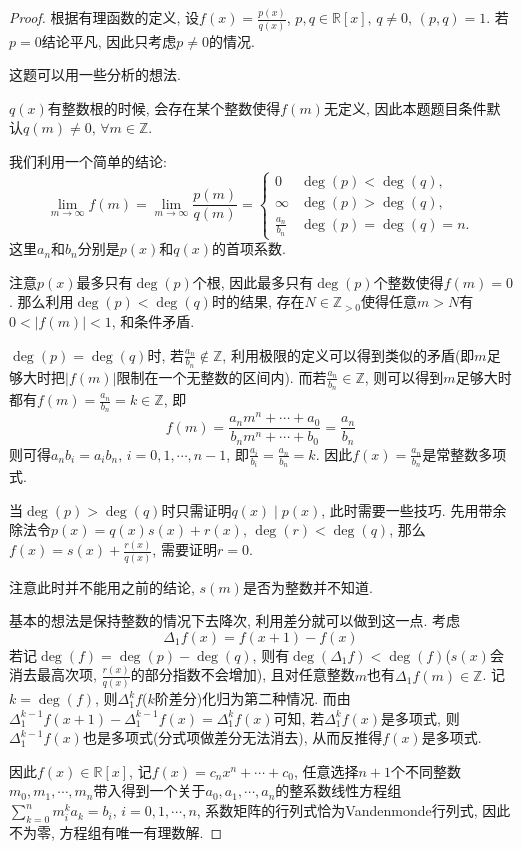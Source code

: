 \begin{proof}
    根据有理函数的定义, 设$f(x) = \frac{p(x)}{q(x)}$, $p, q \in \mathbb{R}[x],\, q \neq 0,\, (p, q) = 1$. 若$p = 0$结论平凡, 因此只考虑$p \neq 0$的情况.
    
    这题可以用一些分析的想法.
    \begin{remark}
        $q(x)$有整数根的时候, 会存在某个整数使得$f(m)$无定义, 因此本题题目条件默认$q(m) \neq 0,\, \forall m \in \mathbb{Z}$.
    \end{remark}
    我们利用一个简单的结论:
    \[
        \lim_{m \to \infty} f(m) = \lim_{m \to \infty} \frac{p(m)}{q(m)} =
        \begin{cases}
            0 & \deg(p) < \deg(q),\\
            \infty & \deg(p) > \deg(q),\\
            \frac{a_n}{b_n} & \deg(p) = \deg(q) = n.
        \end{cases}
    \]
    这里$a_n$和$b_n$分别是$p(x)$和$q(x)$的首项系数.

    注意$p(x)$最多只有$\deg(p)$个根, 因此最多只有$\deg(p)$个整数使得$f(m) = 0$. 那么利用$\deg(p) < \deg(q)$时的结果, 存在$N \in \mathbb{Z}_{>0}$使得任意$m > N$有$0 < |f(m)| < 1$, 和条件矛盾.

    $\deg(p) = \deg(q)$时, 若$\frac{a_n}{b_n} \notin \mathbb{Z}$, 利用极限的定义可以得到类似的矛盾(即$m$足够大时把$|f(m)|$限制在一个无整数的区间内). 而若$\frac{a_n}{b_n} \in \mathbb{Z}$, 则可以得到$m$足够大时都有$f(m) = \frac{a_n}{b_n} = k \in \mathbb{Z}$, 即
    \[
        f(m) = \frac{a_nm^n + \cdots + a_0}{b_nm^n + \cdots + b_0} = \frac{a_n}{b_n} 
    \]
    则可得$a_nb_i = a_ib_n,\, i = 0, 1, \cdots, n - 1$, 即$\frac{a_i}{b_i} = \frac{a_n}{b_n} = k$. 因此$f(x) = \frac{a_n}{b_n}$是常整数多项式.

    当$\deg(p) > \deg(q)$时只需证明$q(x) \mid p(x)$, 此时需要一些技巧. 先用带余除法令$p(x) = q(x)s(x) + r(x),\, \deg(r) < \deg(q)$, 那么$f(x) = s(x) + \frac{r(x)}{q(x)}$, 需要证明$r = 0$.
    \begin{remark}
        注意此时并不能用之前的结论, $s(m)$是否为整数并不知道.
    \end{remark}
    基本的想法是保持整数的情况下去降次, 利用差分就可以做到这一点. 考虑
    \[
        \Delta_1 f(x) = f(x + 1) - f(x) 
    \]
    若记$\deg(f) = \deg(p) - \deg(q)$, 则有$\deg(\Delta_1 f) < \deg(f)$($s(x)$会消去最高次项, $\frac{r(x)}{q(x)}$的部分指数不会增加), 且对任意整数$m$也有$\Delta_1 f(m) \in \mathbb{Z}$. 记$k = \deg(f)$, 则$\Delta_1^k f$($k$阶差分)化归为第二种情况. 而由$\Delta_1^{k - 1} f(x + 1) - \Delta_1^{k - 1} f(x) = \Delta_1^k f(x)$可知, 若$\Delta_1^k f(x)$是多项式, 则$\Delta_1^{k - 1} f(x)$也是多项式(分式项做差分无法消去), 从而反推得$f(x)$是多项式.

    因此$f(x) \in \mathbb{R}[x]$, 记$f(x) = c_nx^n + \cdots + c_0$, 任意选择$n + 1$个不同整数$m_0, m_1, \cdots, m_n$带入得到一个关于$a_0, a_1, \cdots, a_n$的整系数线性方程组$\sum_{k = 0}^{n} m_i^ka_k = b_i,\, i = 0, 1, \cdots, n$, 系数矩阵的行列式恰为Vandenmonde行列式, 因此不为零, 方程组有唯一有理数解.
\end{proof}